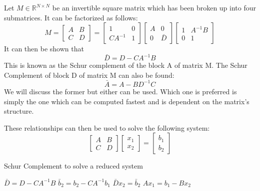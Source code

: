 \documentclass[peerreview,compsoc,onecolumn]{IEEEtran}
\newcommand{\R}{\mathbb{R}}
\begin{document}
Let $M \in \R^{N \times N}$ be an invertible square matrix which has been broken up into four submatrices. It can be factorized as follows:
\begin{equation}
M = \begin{bmatrix}
A & B \\
C & D
\end{bmatrix}
=
\begin{bmatrix}
1 & 0 \\
C A^{-1} & 1
\end{bmatrix}
\begin{bmatrix}
A & 0 \\
0 & \bar{D}
\end{bmatrix}
\begin{bmatrix}
1 & A^{-1}B \\
0 & 1
\end{bmatrix}
\end{equation}
It can then be shown that
\begin{equation}
\bar{D} = D - C A^{-1}B
\end{equation}
This is known as the Schur complement of the block A of matrix M. The Schur Complement of block D of matrix M can also be found:
\begin{equation}
\bar{A} = A - B D^{-1}C
\end{equation}
We will discuss the former but either can be used. Which one is preferred is simply the one which can be computed fastest and is dependent on the matrix's structure.

These relationships can then be used to solve the following system:
\begin{equation}
\begin{bmatrix}
A & B \\
C & D
\end{bmatrix}
\begin{bmatrix}
x_1 \\ x_2
\end{bmatrix}
=
\begin{bmatrix}
b_1 \\ b_2
\end{bmatrix}
\end{equation}

\begin{algorithm}{}
\caption{\label{alg:schur_complement}Schur Complement to solve a reduced system}
\begin{algorithmic}[1]
	\State $\bar{D} = D - C A^{-1} B$
	\State $\bar{b}_2 = b_2 - C A^{-1} b_1$  
	\State $\bar{D} x_2 = \bar{b}_2$         
	\State $A x_1 = b_1 - B x_2$
\end{algorithmic}
\end{algorithm}
\end{document}
